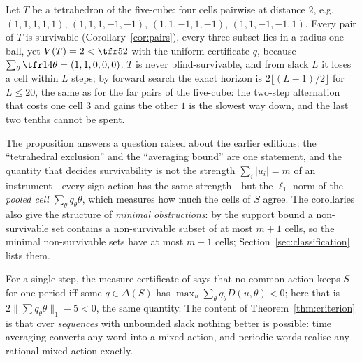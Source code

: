 \begin{proposition}\label{prop:incomparable}
Let $T$ be a tetrahedron of the five-cube: four cells pairwise at distance $2$, e.g. $(1,1,1,1,1)$, $(1,1,1,-1,-1)$, $(1,1,-1,1,-1)$, $(1,1,-1,-1,1)$. Every pair of $T$ is survivable (Corollary~\ref{cor:pairs}), every three-subset lies in a radius-one ball, yet $V(T)=2<\tfr52$ with the uniform certificate $q$, because $\sum_\theta\tfr14\theta=(1,1,0,0,0)$. $T$ is never blind-survivable, and from slack $L$ it loses a cell within $L$ steps; by forward search the exact horizon is $2\lfloor(L-1)/2\rfloor$ for $L\le20$, the same as for the far pairs of the five-cube: the two-step alternation that costs one cell $3$ and gains the other $1$ is the slowest way down, and the last two tenths cannot be spent.
\end{proposition}

The proposition answers a question raised about the earlier editions: the ``tetrahedral exclusion'' and the ``averaging bound'' are one statement, and the quantity that decides survivability is not the strength $\sum_i|u_i|=m$ of an instrument---every sign action has the same strength---but the $\ell_1$ norm of the \emph{pooled cell} $\sum_\theta q_\theta\theta$, which measures how much the cells of $S$ agree. The corollaries also give the structure of \emph{minimal obstructions}: by the support bound a non-survivable set contains a non-survivable subset of at most $m+1$ cells, so the minimal non-survivable sets have at most $m+1$ cells; Section~\ref{sec:classification} lists them.

\begin{remark}
For a single step, the measure certificate of \cite{Abaee2026minimax} says that no common action keeps $S$ for one period iff some $q\in\Delta(S)$ has $\max_u\sum_\theta q_\theta D(u,\theta)<0$; here that is $2\|\sum q_\theta\theta\|_1-5<0$, the same quantity. The content of Theorem~\ref{thm:criterion} is that over \emph{sequences} with unbounded slack nothing better is possible: time averaging converts any word into a mixed action, and periodic words realise any rational mixed action exactly.
\end{remark}
